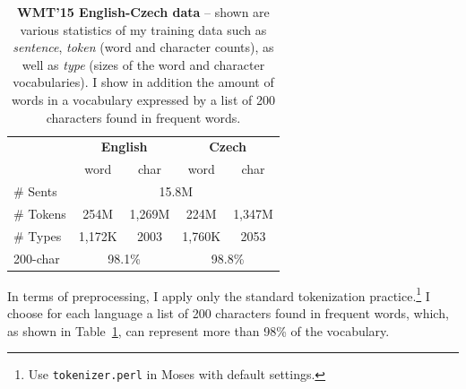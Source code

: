 \begin{table} %
\centering
\begin{tabular}{l|c|c|c|c}
& \multicolumn{2}{c|}{\bf{English}} & \multicolumn{2}{c}{\bf{Czech}}\\
  \cline{2-5}
& word & char & word & char \\
  \hline
  \# Sents & \multicolumn{4}{c}{15.8M} \\
  \hdashline
  \# Tokens & 254M & 1,269M & 224M & 1,347M \\ 
 \hdashline
  \# Types & 1,172K & 2003 & 1,760K & 2053\\ 
  \hline
  200-char & \multicolumn{2}{c|}{98.1\%} & \multicolumn{2}{c}{98.8\%} \\
\end{tabular}
\caption[WMT'15 English-Czech data]{{\bf WMT'15 English-Czech data} -- shown are various statistics of my training
data such as {\it sentence}, {\it token} (word and character counts), as well as
{\it type} (sizes of the word and character vocabularies).
I show in addition the amount of words in a vocabulary expressed by a list of 200 characters found
in frequent words.}
\label{t:data}
\end{table}

In terms of preprocessing, I apply only the standard tokenization practice.\footnote{Use \texttt{tokenizer.perl} in Moses with
default settings.} I choose for each language a list of 200
characters found in frequent words, which, as shown in Table~\ref{t:data}, can
represent more than 98\% of the vocabulary. 



